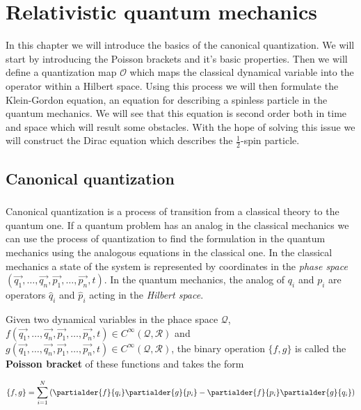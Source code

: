 \chapter{Relativistic quantum mechanics}

In this chapter we will introduce the basics of the canonical quantization. We will start by introducing the
Poisson brackets and it's basic properties. Then we will define a quantization map $\mathcal{O}$ which maps the
classical dynamical variable into the operator within a Hilbert space. Using this process we will then
formulate the Klein-Gordon equation, an equation for describing a spinless particle in the quantum mechanics.
We will see that this equation is second order both in time and space which will result some obstacles. With the
hope of solving this issue we will construct the Dirac equation which describes the $\frac{1}{2}$-spin particle.

\section{Canonical quantization}

\paragraph{} Canonical quantization is a process of transition from a classical theory to the quantum one. If a 
quantum problem has an analog in the classical mechanics we can use the process of quantization to find the formulation
in the quantum mechanics using the analogous equations in the classical one. In the classical mechanics a state of the system
is represented by coordinates in the \textit{phase space} $(\vec{q_{1}}, \dots, \vec{q_{n}}, \vec{p_{1}}, \dots, \vec{p_{n}}, t)$.
In the quantum mechanics, the analog of $q_{i}$ and $p_{i}$ are operators $\hat{q}_{i}$ and $\hat{p}_{i}$ acting in the 
\textit{Hilbert space}.

\begin{definition}
    \label{df:poisson}
    Given two dynamical variables in the phace space $\mathcal{Q}$, \newline $f(\vec{q_{1}}, \dots, \vec{q_{n}}, \vec{p_{1}}, \dots, \vec{p_{n}}, t) 
    \in C^{\infty}(\mathcal{Q}, \mathcal{R})$ and $g(\vec{q_{1}}, \dots, \vec{q_{n}}, \vec{p_{1}}, \dots, \vec{p_{n}}, t) 
    \in C^{\infty}(\mathcal{Q}, \mathcal{R})$, the binary operation $\{f, g\}$ is called the \textbf{Poisson bracket} of these functions and takes the form

    \begin{equation}
        \{f, g\} = \sum_{i=1}^{N}\left(\partialder{f}{q_{i}} \partialder{g}{p_{i}} - \partialder{f}{p_{i}} \partialder{g}{q_{i}}\right)
    \end{equation}
\end{definition}

